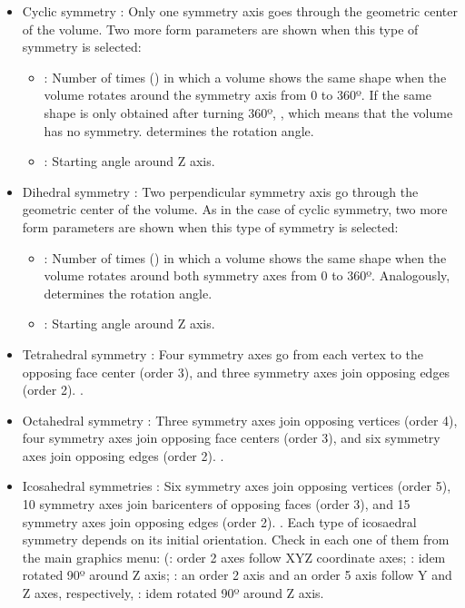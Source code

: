 \begin{itemize}
\begin{itemize}
  \begin{itemize}
  \item Cyclic symmetry : Only one symmetry axis goes through the geometric center of the volume. Two more form parameters are shown when this type of symmetry is selected:\\
   \begin{itemize}
    \item {}: Number of times () in which a volume shows the same shape when the volume rotates around the symmetry axis from 0 to 360º. If the same shape is only obtained after turning 360º, , which means that the volume has no symmetry.  determines the rotation angle. \\ 
	\item {}: Starting angle around Z axis.\\ 
   \end{itemize}
  \item Dihedral symmetry : Two perpendicular symmetry axis go through the geometric center of the volume. As in the case of cyclic symmetry, two more form parameters are shown when this type of symmetry is selected:\\
   \begin{itemize}
    \item {}: Number of times () in which a volume shows the same shape when the volume rotates around both symmetry axes from 0 to 360º. Analogously,  determines the rotation angle.\\ 
	\item {}: Starting angle around Z axis.\\ 
   \end{itemize}
  \item Tetrahedral symmetry : Four symmetry axes go from each vertex to the opposing face center (order 3), and three symmetry axes join opposing edges (order 2). .\\
  \item Octahedral symmetry : Three symmetry axes join opposing vertices (order 4), four symmetry axes join opposing face centers (order 3), and six symmetry axes join opposing edges (order 2). .\\
  \item Icosahedral symmetries : Six symmetry axes join opposing vertices (order 5), 10 symmetry axes join baricenters of opposing faces (order 3), and 15 symmetry axes join opposing edges (order 2). . Each type of icosaedral symmetry depends on its initial orientation. Check in \chimera each one of them from the main graphics menu:  (: order 2 axes follow XYZ coordinate axes; : idem rotated 90º around Z axis; : an order 2 axis and an order 5 axis follow Y and Z axes, respectively, : idem rotated 90º around Z axis.\\
  \end{itemize}
  

\end{itemize}
\end{itemize}
